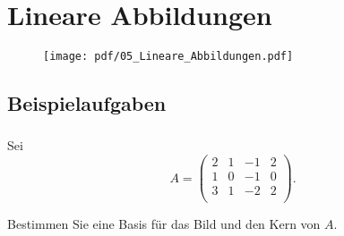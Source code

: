 \section{Lineare Abbildungen}
\begin{figure}[h!]
    \texttt{[image: pdf/05\_Lineare\_Abbildungen.pdf]}
\end{figure}
\newpage



\subsection{Beispielaufgaben} %

\vspace{1cm}

\subsubsection{} %
Sei
\begin{equation*}
    A = \begin{pmatrix}
    2 & 1 & -1 & 2 \\
    1 & 0 & -1 & 0 \\
    3 & 1 & -2 & 2 \\
    \end{pmatrix}.
\end{equation*}

Bestimmen Sie eine Basis für das Bild und den Kern von \( A \).

\vspace{1\baselineskip}

